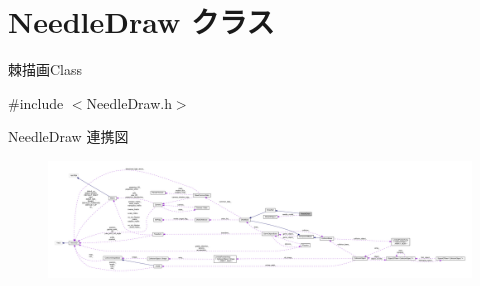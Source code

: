 \hypertarget{class_needle_draw}{}\section{Needle\+Draw クラス}
\label{class_needle_draw}


棘描画\+Class  




{\ttfamily \#include $<$Needle\+Draw.\+h$>$}



Needle\+Draw 連携図\nopagebreak
\begin{figure}[H]
\begin{center}
\leavevmode
\includegraphics[width=350pt]{class_needle_draw__coll__graph}
\end{center}
\end{figure}
